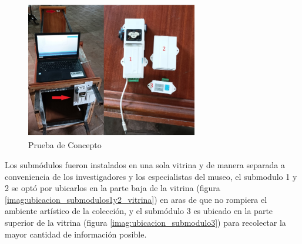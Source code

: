     \begin{figure}[H]
      \centering
      \includegraphics[width=7.5cm, height=6cm]{imagenes/prueba_concepto.jpg}
      \caption{Prueba de Concepto}
      \label{imag:prueba_concepto}
    \end{figure}

    Los submódulos fueron instalados en una sola vitrina y de manera separada a conveniencia de los investigadores y los especialistas del museo, el submodulo 1 y 2 se optó por ubicarlos en la parte baja de la vitrina (figura \ref{imag:ubicacion_submodulos1y2_vitrina}) en aras de que no rompiera el ambiente artístico de la colección,
    y el submódulo 3 es ubicado en la parte superior de la vitrina (figura \ref{imag:ubicacion_submodulo3}) para recolectar la mayor cantidad de información posible.


